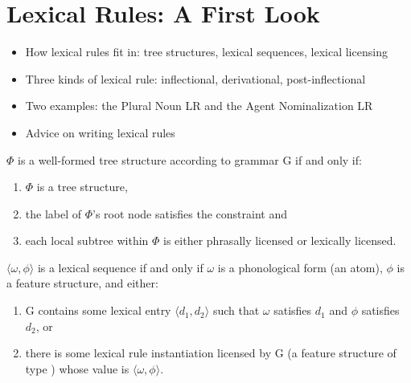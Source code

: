 \documentclass[a4paper,landscape,headrule,footrule]{foils}
\begin{document}
\section{Lexical Rules: A First Look}

\begin{itemize}
\item How lexical rules fit in: tree structures, lexical sequences,
  lexical licensing
\item Three kinds of lexical rule: inflectional, derivational,
  post-inflectional
\item Two examples: the Plural Noun LR and the Agent Nominalization LR
\item Advice on writing lexical rules
\end{itemize}

$\Phi$ is a well-formed tree structure according to grammar G
if and only if:
\begin{enumerate}
\item $\Phi$ is a tree structure,
\item the label of $\Phi$'s root node satisfies the constraint
   and
\item each local subtree within $\Phi$ is either phrasally licensed
  or lexically licensed.
\end{enumerate}

$\langle\omega, \phi\rangle$ is a lexical sequence if and only if
$\omega$ is a phonological form (an atom), $\phi$ is a feature
structure, and either:
\begin{enumerate}
\item G contains some lexical entry $\langle d_1, d_2\rangle$
  such that $\omega$ satisfies $d_1$ and $\phi$ satisfies $d_2$, or
\item there is some lexical rule instantiation licensed by G
  (a feature structure of type ) whose 
  value is $\langle\omega, \phi\rangle$.
\end{enumerate}
\end{document}
